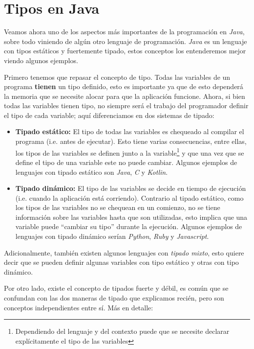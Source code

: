 \section{Tipos en Java}
  Veamos ahora uno de los aspectos más importantes de la programación en \textit{Java}, sobre todo
  viniendo de algún otro lenguaje de programación.
  \textit{Java} es un lenguaje con tipos estáticos y fuertemente tipado, estos conceptos los 
  entenderemos mejor viendo algunos ejemplos.

  Primero tenemos que repasar el concepto de tipo.
  Todas las variables de un programa \textbf{tienen} un tipo definido, esto es importante ya que
  de esto dependerá la memoria que se necesite alocar para que la aplicación funcione.
  Ahora, si bien todas las variables tienen tipo, no siempre será el trabajo del programador
  definir el tipo de cada variable; aquí diferenciamos en dos sistemas de tipado:

  \begin{itemize}
    \item \textbf{Tipado estático:} El tipo de todas las variables es chequeado al compilar el 
      programa (i.e. antes de ejecutar).
      Esto tiene varias consecuencias, entre ellas, los tipos de las variables se definen junto
      a la variable\footnote{Dependiendo del lenguaje y del contexto puede que se necesite 
      declarar explícitamente el tipo de las variables} y que una vez que se define el tipo de
      una variable este no puede cambiar.
      Algunos ejemplos de lenguajes con tipado estático son \textit{Java}, \textit{C} y 
      \textit{Kotlin}.
    \item \textbf{Tipado dinámico:} El tipo de las variables se decide en tiempo de ejecución 
      (i.e. cuando la aplicación está corriendo).
      Contrario al tipado estático, como los tipos de las variables no se chequean en un 
      comienzo, no se tiene información sobre las variables hasta que son utilizadas, esto 
      implica que una variable puede \enquote{cambiar su tipo} durante la ejecución.
      Algunos ejemplos de lenguajes con tipado dinámico serían \textit{Python}, \textit{Ruby} y
      \textit{Javascript}.
  \end{itemize}
  
  Adicionalmente, también existen algunos lenguajes con \textit{tipado mixto}, esto quiere decir
  que se pueden definir algunas variables con tipo estático y otras con tipo dinámico.

  Por otro lado, existe el concepto de tipados fuerte y débil, es común que se confundan con las
  dos maneras de tipado que explicamos recién, pero son conceptos independientes entre sí.
  Más en detalle:

